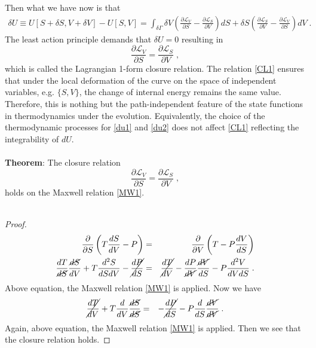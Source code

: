 \documentclass[12pt]{article}
\numberwithin{equation}{section}
\theoremstyle{remark}
\theoremstyle{definition}
\newcommand{\nn}{\nonumber}
\begin{document}
Then what we have now is that
\begin{eqnarray}
    \delta U\equiv U[S+\delta S,V+\delta V]-U[S,V]=\int_{\delta\Gamma}\delta V\left(\frac{\partial\mathcal{L}_V}{\partial S}-\frac{\partial\mathcal{L}_S}{\partial V}\right)dS+\delta S\left(\frac{\partial\mathcal{L}_S}{\partial V}-\frac{\partial\mathcal{L}_V}{\partial S}\right)dV\;.
\end{eqnarray}
The least action principle demands that $\delta U=0$ resulting in
\begin{equation}\label{CL1}
    \frac{\partial\mathcal{L}_V}{\partial S}=\frac{\partial\mathcal{L}_S}{\partial V}\;,
\end{equation}
which is called the Lagrangian 1-form closure relation. The relation \eqref{CL1} ensures that under the local deformation of the curve on the space of independent variables, e.g. $\{S,V\}$, the change of internal energy remains the same value. Therefore, this is nothing but the path-independent feature of the state functions in thermodynamics under the evolution. Equivalently, the choice of the thermodynamic processes for \eqref{du1} and \eqref{du2} does not affect \eqref{CL1} reflecting the integrability of $dU$.
\\
\\
\textbf{Theorem}: The closure relation 
\begin{equation}
    \frac{\partial\mathcal{L}_V}{\partial S}=\frac{\partial\mathcal{L}_S}{\partial V}\;,\nn
\end{equation}
holds on the Maxwell relation \eqref{MW1}.
\\
\\
\begin{proof} 
\begin{eqnarray}
    \frac{\partial}{\partial S}\left(T\frac{dS}{dV}-P\right)&=&\frac{\partial}{\partial V}\left(T-P\frac{dV}{dS}\right)\nn\\
    \frac{dT}{\cancel{dS}}\frac{\cancel{dS}}{dV}+T\frac{d^2S}{dSdV}-\cancel{\frac{dP}{dS}}&=&\cancel{\frac{dT}{dV}}-\frac{dP}{\cancel{dV}}\frac{\cancel{dV}}{dS}-P\frac{d^2V}{dVdS}\;.
\end{eqnarray}
Above equation, the Maxwell relation \eqref{MW1} is applied. Now we have
\begin{eqnarray}
    \cancel{\frac{dT}{dV}}+T\frac{d}{dV}\frac{\cancel{dS}}{\cancel{dS}}&=&-\cancel{\frac{dP}{dS}}-P\frac{d}{dS}\frac{\cancel{dV}}{\cancel{dV}}\;.
\end{eqnarray}
Again, above equation, the Maxwell relation \eqref{MW1} is applied. Then we see that the closure relation holds.
\end{proof}
\end{document}
